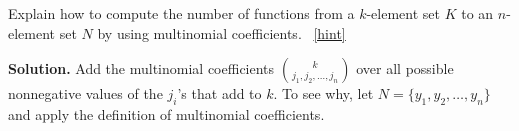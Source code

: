 \documentclass{book}
\begin{document}
\setcounter{project}{282}
\addtocounter{project}{-1}
\begin{activity}[]\label{activity-275}
\hypertarget{p-1497}{}%
Explain how to compute the number of functions from a \(k\)-element set \(K\) to an \(n\)-element set \(N\) by using multinomial coefficients.%
~\hfill{\tiny\hyperlink{a-282}{[hint]}\hypertarget{q-282}{}}\par\smallskip%
\noindent\textbf{Solution.}\hypertarget{solution-220}{}\quad%
\hypertarget{p-1499}{}%
Add the multinomial coefficients \(\binom{k}{j_1,j_2,\ldots,j_n}\) over all possible nonnegative values of the \(j_i\)'s that add to \(k\).  To see why, let \(N=\{y_1,y_2,\ldots,y_n\}\) and apply the definition of multinomial coefficients.%
\end{activity}
\end{document}

